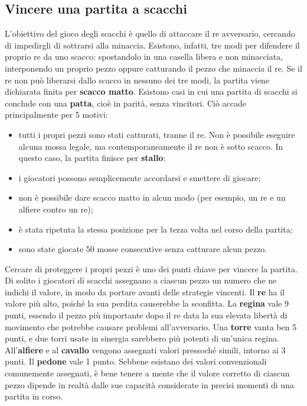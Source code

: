 \subsection{Vincere una partita a scacchi}
\label{cap: valore_pezzi}
L'obiettivo del gioco degli scacchi è quello di attaccare il re avversario, cercando di impedirgli di sottrarsi alla minaccia. Esistono, infatti, tre modi per difendere il proprio re da uno scacco: spostandolo in una casella libera e non minacciata, interponendo un proprio pezzo oppure catturando il pezzo che minaccia il re. Se il re non può liberarsi dallo scacco in nessuno dei tre modi, la partita viene dichiarata finita per \textbf{scacco matto}. Esistono casi in cui una partita di scacchi si conclude con una \textbf{patta}, cioè in parità, senza vincitori. Ciò accade principalmente per 5 motivi:
\begin{itemize}
    \item tutti i propri pezzi sono stati catturati, tranne il re. Non è possibile eseguire alcuna mossa legale, ma contemporaneamente il re non è sotto scacco. In questo caso, la partita finisce per \textbf{stallo}:
    \item i giocatori possono semplicemente accordarsi e smettere di giocare;
    \item non è possibile dare scacco matto in alcun modo (per esempio, un re e un alfiere contro un re);
    \item è stata ripetuta la stessa posizione per la terza volta nel corso della partita;
    \item sono state giocate 50 mosse consecutive senza catturare alcun pezzo.
\end{itemize}
Cercare di proteggere i propri pezzi è uno dei punti chiave per vincere la partita. Di solito i giocatori di scacchi assegnano a ciascun pezzo un numero che ne indichi il valore, in modo da portare avanti delle strategie vincenti. Il \textbf{re} ha il valore più alto, poiché la sua perdita causerebbe la sconfitta. La \textbf{regina} vale 9 punti, essendo il pezzo più importante dopo il re data la sua elevata libertà di movimento che potrebbe causare problemi all'avversario. Una \textbf{torre} vanta ben 5 punti, e due torri usate in sinergia sarebbero più potenti di un'unica regina. All'\textbf{alfiere} e al \textbf{cavallo} vengono assegnati valori pressoché simili, intorno ai 3 punti. Il \textbf{pedone} vale 1 punto. Sebbene esistano dei valori convenzionali comunemente assegnati, è bene tenere a mente che il valore corretto di ciascun pezzo dipende in realtà dalle sue capacità considerate in precisi momenti di una partita in corso\cite{itwiki:106074354}. 

